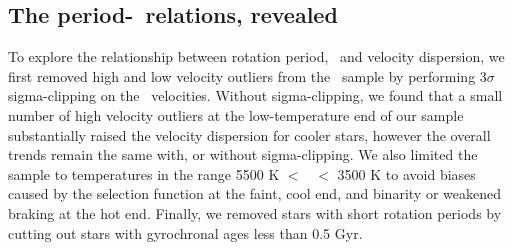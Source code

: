 
\subsection{The period-\teff\ relations, revealed}
\label{sec:the_reveal}

To explore the relationship between rotation period, \teff\ and velocity
dispersion, we first removed high and low velocity outliers from the \mct\
sample by performing 3$\sigma$ sigma-clipping on the \vb\ velocities.
Without sigma-clipping, we found that a small number of high velocity
outliers at the low-temperature end of our sample substantially raised the
velocity dispersion for cooler stars, however the overall trends remain the
same with, or without sigma-clipping.
We also limited the sample to temperatures in the range 5500 K $<$ \teff\ $<$
3500 K to avoid biases caused by the selection function at the faint, cool
end, and binarity or weakened braking \citep{vansaders2016} at the hot end.
Finally, we removed stars with short rotation periods by cutting out stars
with gyrochronal ages less than 0.5 Gyr.

